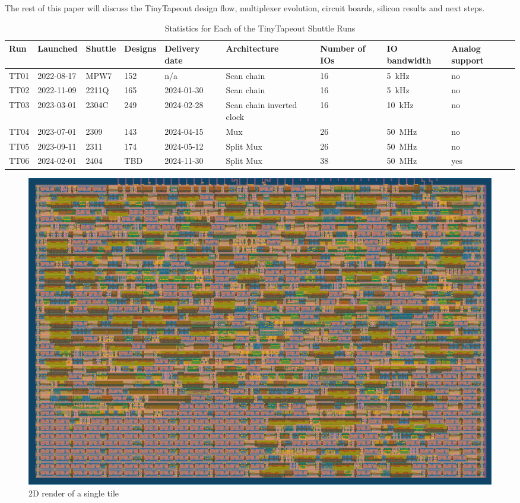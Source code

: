 The rest of this paper will discuss the TinyTapeout design flow, multiplexer evolution, circuit boards, silicon results and next steps.

\begin{table}[!t]
\centering
\caption{Statistics for Each of the TinyTapeout Shuttle Runs}
\label{tab:tinytapeout}
\begin{tabularx}{\textwidth}{@{}l *{8}{X}@{}}
\toprule
\textbf{Run} & \textbf{Launched} & \textbf{Shuttle} & \textbf{Designs} & \textbf{Delivery date} & \textbf{Architecture} & \textbf{Number of IOs} & \textbf{IO bandwidth} & \textbf{Analog support} \\
\midrule
TT01 & 2022-08-17  & MPW7  & 152 & n/a        & Scan chain                & 16 & \qty{5}{\kHz}    & no  \\
TT02 & 2022-11-09  & 2211Q & 165 & 2024-01-30 & Scan chain                & 16 & \qty{5}{\kHz}    & no  \\
TT03 & 2023-03-01  & 2304C & 249 & 2024-02-28 & Scan chain inverted clock & 16 & \qty{10}{\kHz}    & no  \\
TT04 & 2023-07-01  & 2309  & 143 & 2024-04-15 & Mux                       & 26 & \qty{50}{\MHz}   & no  \\
TT05 & 2023-09-11  & 2311  & 174 & 2024-05-12 & Split Mux                 & 26 & \qty{50}{\MHz}   & no  \\
TT06 & 2024-02-01  & 2404  & TBD & 2024-11-30 & Split Mux                 & 38 & \qty{50}{\MHz}   & yes \\
\bottomrule
\end{tabularx}
\end{table}

\begin{figure}[!t]
\centering
\includegraphics[width=\columnwidth]{./Figs/gh action gds layout.png}
\caption{2D render of a single tile}
\label{fig:render_cells_in_use}
\end{figure}


